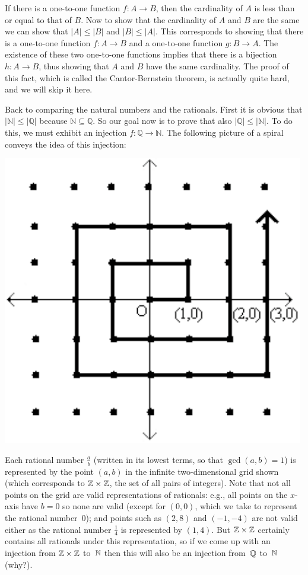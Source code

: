 \documentclass[11pt,fleqn]{article}
\begin{document}
If there is a one-to-one function $f:A \rightarrow B$, then the
cardinality of $A$ is less than or equal to that of $B$.
Now to show that the cardinality of $A$ and $B$ are the same
we can show that $|A| \leq |B|$ and $|B| \leq |A|$. This
corresponds to showing that there is a one-to-one function
$f: A \rightarrow B$ and a one-to-one function $g: B \rightarrow A$.
The existence of these two one-to-one functions implies that there
is a bijection $h: A \rightarrow B$, thus showing that $A$ and
$B$ have the same cardinality. The proof of this fact, which is
called the Cantor-Bernstein theorem, is actually quite hard, and
we will skip it here.

Back to comparing the natural numbers and the rationals. First it is
obvious that $|\mathbb{N}|\le |\mathbb{Q}|$ because $\mathbb{N}\subseteq\mathbb{Q}$.
So our goal now is to prove that also $|\mathbb{Q}|\le|\mathbb{N}|$.  To do this,
we must exhibit an injection  $f:\mathbb{Q}\to\mathbb{N}$. The following picture
of a spiral conveys the idea of this injection:

\includegraphics[scale = 0.7]{spiral}

Each rational number $\frac{a}{b}$ (written in its lowest terms, so that
$\gcd(a,b)=1$) is represented by the point $(a,b)$ in the infinite two-dimensional
grid shown (which corresponds to $\mathbb{Z}\times\mathbb{Z}$, the set of all pairs of integers).
Note that not all points on the grid are valid representations of rationals: e.g.,
all points on the $x$-axis have $b=0$ so none are valid (except for $(0,0)$, which
we take to represent the rational number~0); and points such as $(2,8)$ and $(-1,-4)$
are not valid either as the rational number $\frac{1}{4}$ is represented by $(1,4)$.
But $\mathbb{Z}\times \mathbb{Z}$ certainly contains all rationals under this representation, so if we
come up with an injection from $\mathbb{Z}\times \mathbb{Z}$ to~$\mathbb{N}$ then this will also be an
injection from~$\mathbb{Q}$ to~$\mathbb{N}$ (why?).
\end{document}

